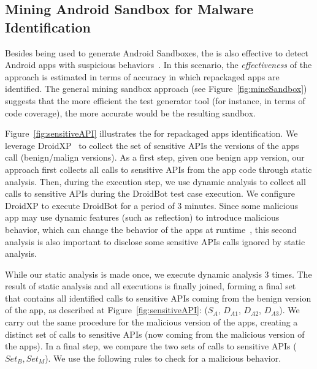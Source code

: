 


\subsection{Mining Android Sandbox for Malware Identification}

Besides being used to generate Android Sandboxes, the \mas is also effective 
to detect Android apps with suspicious behaviors~\cite{DBLP:conf/wcre/BaoLL18}. In this scenario, the \emph{effectiveness} of the approach
is estimated in terms of accuracy in which repackaged apps are identified.
The general mining sandbox approach (see Figure~\ref{fig:mineSandbox}) suggests
that the more efficient the test generator tool (for instance, in terms of code coverage),
the more accurate would be the resulting sandbox.


Figure~\ref{fig:sensitiveAPI} illustrates the \mas for
repackaged apps identification. We leverage DroidXP~\cite{DBLP:conf/scam/CostaMCMVBC20} to collect the set of sensitive APIs the versions of the apps call (benign/malign versions). As a first step, given one benign app version,
our approach first collects all calls to sensitive APIs from the app code through static analysis. Then, during the execution step,
we use dynamic analysis to collect all calls to sensitive APIs during the DroidBot test case execution. We configure DroidXP to execute DroidBot for a
period of $3$ minutes. Since some malicious app may use dynamic features (such as reflection) to introduce malicious behavior, which can change the behavior of the apps at runtime~\cite{DBLP:journals/spe/ZhangLTX18,DBLP:journals/tosem/LiTX19}, this second analysis is also important to disclose some sensitive APIs calls ignored by static analysis.

While our static analysis is made once, we execute dynamic analysis $3$ times. The result of static analysis and all executions is finally joined, forming a final set that contains all identified calls to sensitive APIs coming from the benign version of the app, as described at Figure~\ref{fig:sensitiveAPI}: ($S_{A}$, $D_{A1}$, $D_{A2}$, $D_{A3}$). We carry out the same procedure for the malicious version of the apps,
creating a distinct set of calls to sensitive APIs (now coming from the malicious version of the apps). In
a final step, we compare the two sets of calls to sensitive APIs ($Set_B, Set_M$). We use the following rules to
check for a malicious behavior. 

